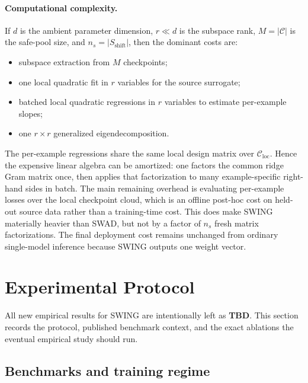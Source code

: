 \documentclass{article}
\newcommand{\cC}{\mathcal{C}}
\newcommand{\TBD}{\textbf{TBD}}
\newcommand{\swing}{\textup{\textsc{SWING}}}
\newcommand{\swad}{\textup{\textsc{SWAD}}}
\begin{document}
\paragraph{Computational complexity.}
If \(d\) is the ambient parameter dimension, \(r\ll d\) is the subspace rank, \(M=|\cC|\) is the safe-pool size, and \(n_s=|S_{\mathrm{shift}}|\), then the dominant costs are:
\begin{itemize}[leftmargin=1.4em]
    \item subspace extraction from \(M\) checkpoints;
    \item one local quadratic fit in \(r\) variables for the source surrogate;
    \item batched local quadratic regressions in \(r\) variables to estimate per-example slopes;
    \item one \(r\times r\) generalized eigendecomposition.
\end{itemize}
The per-example regressions share the same local design matrix over \(\cC_{\mathrm{loc}}\). Hence the expensive linear algebra can be amortized: one factors the common ridge Gram matrix once, then applies that factorization to many example-specific right-hand sides in batch. The main remaining overhead is evaluating per-example losses over the local checkpoint cloud, which is an offline post-hoc cost on held-out source data rather than a training-time cost. This does make \swing{} materially heavier than \swad{}, but not by a factor of \(n_s\) fresh matrix factorizations.
The final deployment cost remains unchanged from ordinary single-model inference because \swing{} outputs one weight vector.

\section{Experimental Protocol}
\label{sec:experiments}

All new empirical results for \swing{} are intentionally left as \TBD{}. This section records the protocol, published benchmark context, and the exact ablations the eventual empirical study should run.

\subsection{Benchmarks and training regime}
\end{document}
